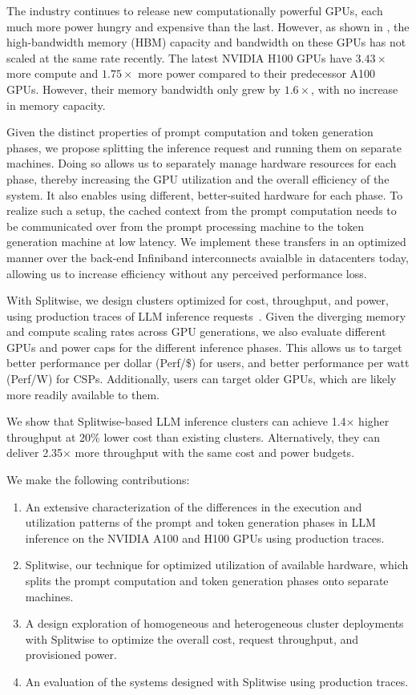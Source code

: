 The industry continues to release new computationally powerful GPUs, each much more power hungry and expensive than the last.
However, as shown in , the high-bandwidth memory (HBM) capacity and bandwidth on these GPUs has not scaled at the same rate recently.
The latest NVIDIA H100 GPUs have $3.43\times$ more compute and $1.75\times$ more power compared to their predecessor A100 GPUs.
However, their memory bandwidth only grew by $1.6\times$, with no increase in memory capacity.


Given the distinct properties of prompt computation and token generation phases, we propose splitting the inference request and running them on separate machines.
Doing so allows us to separately manage hardware resources for each phase, thereby increasing the GPU utilization and the overall efficiency of the system.
It also enables using different, better-suited hardware for each phase.
To realize such a setup, the cached context from the prompt computation needs to be communicated over from the prompt processing machine to the token generation machine at low latency.
We implement these transfers in an optimized manner over the back-end Infiniband interconnects avaialble in datacenters today, allowing us to increase efficiency without any perceived performance loss. 

With Splitwise, we design clusters optimized for cost, throughput, and power, using production traces of LLM inference requests~\cite{azure_llm_trace}. 
Given the diverging memory and compute scaling rates across GPU generations, we also evaluate different GPUs and power caps for the different inference phases. 
This allows us to target better performance per dollar (Perf/\$) for users, and better performance per watt (Perf/W) for CSPs.
Additionally, users can target older GPUs, which are likely more readily available to them.

We show that Splitwise-based LLM inference clusters can achieve 1.4$\times$ higher throughput at 20\% lower cost than existing clusters. Alternatively, they can deliver 2.35$\times$ more throughput with the same cost and power budgets.


We make the following contributions:
\begin{enumerate}[leftmargin=*]
\item An extensive characterization of the differences in the execution and utilization patterns of the prompt and token generation phases in LLM inference on the NVIDIA A100 and H100 GPUs using production traces.
\item Splitwise, our technique for optimized utilization of available hardware, which splits the prompt computation and token generation phases onto separate machines.
\item A design exploration of homogeneous and heterogeneous cluster deployments with Splitwise to optimize the overall cost, request throughput, and provisioned power.
\item An evaluation of the systems designed with Splitwise using production traces.
\end{enumerate}
